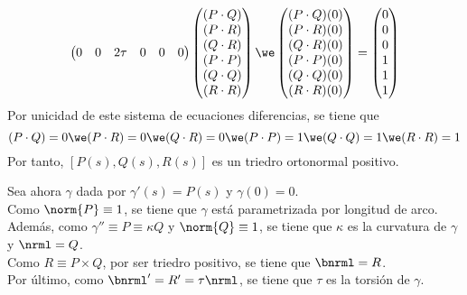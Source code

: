 \begin{teo}[Existencia]
\begin{dem}
\[\begin{pmatrix}
                0        & 0        & 2\tau  & 0        & 0      & 0
			\end{pmatrix}\begin{pmatrix} (P \cdot Q) \\ (P \cdot R) \\ (Q \cdot R) \\ (P \cdot P) \\ (Q \cdot Q) \\ (R \cdot R) \end{pmatrix} \we \begin{pmatrix}
				(P \cdot Q)(0) \\ (P \cdot R)(0) \\ (Q \cdot R)(0) \\ (P \cdot P)(0) \\ (Q \cdot Q)(0) \\ (R \cdot R)(0)
			\end{pmatrix} = \begin{pmatrix}
				0 \\ 0 \\ 0 \\ 1 \\ 1 \\ 1
			\end{pmatrix}\]
		Por unicidad de este sistema de ecuaciones diferencias, se tiene que
		\[(P\cdot Q) = 0 \we (P\cdot R) = 0 \we (Q\cdot R) = 0 \we (P\cdot P) = 1 \we (Q\cdot Q) = 1 \we (R\cdot R) = 1\]
		Por tanto, $\left[P(s), Q(s), R(s)\right]$ es un triedro ortonormal positivo.

		Sea ahora $\gamma$ dada por $\gamma'(s) = P(s)$ y $\gamma(0)=0$. \\
		Como $\norm{P} \equiv 1$, se tiene que $\gamma$ está parametrizada por longitud de arco. \\
		Además, como $\gamma''\equiv P \equiv \kappa Q$ y $\norm{Q}\equiv 1$, se tiene que $\kappa$ es la curvatura de $\gamma$ y $\nrml = Q$. \\
		Como $R\equiv P \times Q$, por ser triedro positivo, se tiene que $\bnrml = R$. \\
		Por último, como $\bnrml' = R' = \tau \nrml$, se tiene que $\tau$ es la torsión de $\gamma$.
	\end{dem}
\end{teo}

